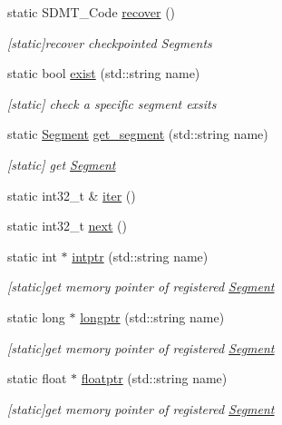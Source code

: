 \begin{DoxyCompactItemize}
static S\+D\+M\+T\+\_\+\+Code \hyperlink{class_s_d_m_t_a3a3723f019f53a371c2c3b49efbed0f5}{recover} ()
\begin{DoxyCompactList}\small\item\em \mbox{[}static\mbox{]}recover checkpointed Segments \end{DoxyCompactList}\item 
static bool \hyperlink{class_s_d_m_t_a409904b122dea3efcacd91b2a3fd1ae0}{exist} (std\+::string name)
\begin{DoxyCompactList}\small\item\em \mbox{[}static\mbox{]} check a specific segment exsits \end{DoxyCompactList}\item 
static \hyperlink{struct_s_d_m_t_1_1_segment}{Segment} \hyperlink{class_s_d_m_t_a8dfbf78068663cc21ff1e7f15fca6e55}{get\+\_\+segment} (std\+::string name)
\begin{DoxyCompactList}\small\item\em \mbox{[}static\mbox{]} get \hyperlink{struct_s_d_m_t_1_1_segment}{Segment} \end{DoxyCompactList}\item 
static int32\+\_\+t \& \hyperlink{class_s_d_m_t_a5d4ee5b7434f84e124825576c8128445}{iter} ()
\item 
static int32\+\_\+t \hyperlink{class_s_d_m_t_a37514bde7d0c4d57bcb17e67f3877ce9}{next} ()
\item 
static int $\ast$ \hyperlink{class_s_d_m_t_a31a70a690a9215643afaf9ef1abb35f1}{intptr} (std\+::string name)
\begin{DoxyCompactList}\small\item\em \mbox{[}static\mbox{]}get memory pointer of registered \hyperlink{struct_s_d_m_t_1_1_segment}{Segment} \end{DoxyCompactList}\item 
static long $\ast$ \hyperlink{class_s_d_m_t_ac36749f096dc877e0ff4bbd7370eebe6}{longptr} (std\+::string name)
\begin{DoxyCompactList}\small\item\em \mbox{[}static\mbox{]}get memory pointer of registered \hyperlink{struct_s_d_m_t_1_1_segment}{Segment} \end{DoxyCompactList}\item 
static float $\ast$ \hyperlink{class_s_d_m_t_a44a9454c55626de3cf5e9b37b9016d6c}{floatptr} (std\+::string name)
\begin{DoxyCompactList}\small\item\em \mbox{[}static\mbox{]}get memory pointer of registered \hyperlink{struct_s_d_m_t_1_1_segment}{Segment} \end{DoxyCompactList}\item 

\end{DoxyCompactItemize}
